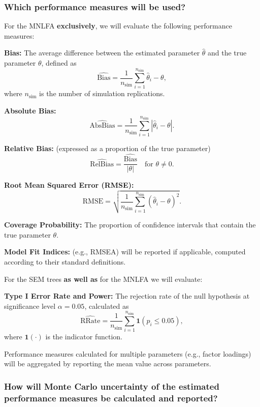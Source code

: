 \documentclass[
  man,
  floatsintext]{apa7}
\begin{document}
\subsubsection{Which performance measures will be
used?}\label{which-performance-measures-will-be-used}

For the MNLFA \textbf{exclusively}, we will evaluate the following
performance measures:

\textbf{Bias:} The average difference between the estimated parameter
\(\hat{\theta}\) and the true parameter \(\theta\), defined as \[
\widehat{\text{Bias}} = \frac{1}{n_{\text{sim}}} \sum_{i=1}^{n_{\text{sim}}} \hat{\theta}_i - \theta,
\] where \(n_{\text{sim}}\) is the number of simulation replications.

\textbf{Absolute Bias:} \[
\widehat{\text{AbsBias}} = \frac{1}{n_{\text{sim}}} \sum_{i=1}^{n_{\text{sim}}} \left| \hat{\theta}_i - \theta \right|.
\]

\textbf{Relative Bias:} (expressed as a proportion of the true
parameter) \[
\widehat{\text{RelBias}} = \frac{\widehat{\text{Bias}}}{|\theta|} \quad \text{for } \theta \neq 0.
\]

\textbf{Root Mean Squared Error (RMSE):} \[
\widehat{\text{RMSE}} = \sqrt{ \frac{1}{n_{\text{sim}}} \sum_{i=1}^{n_{\text{sim}}} (\hat{\theta}_i - \theta)^2}.
\]

\textbf{Coverage Probability:} The proportion of confidence intervals
that contain the true parameter \(\theta\).

\textbf{Model Fit Indices:} (e.g., RMSEA) will be reported if
applicable, computed according to their standard definitions.

For the SEM trees \textbf{as well as} for the MNLFA we will evaluate:

\textbf{Type I Error Rate and Power:} The rejection rate of the null
hypothesis at significance level \(\alpha = 0.05\), calculated as \[
\widehat{\text{RRate}} = \frac{1}{n_{\text{sim}}} \sum_{i=1}^{n_{\text{sim}}} \mathbf{1}(p_i \leq 0.05),
\] where \(\mathbf{1}(\cdot)\) is the indicator function.

Performance measures calculated for multiple parameters (e.g., factor
loadings) will be aggregated by reporting the mean value across
parameters.

\subsubsection{How will Monte Carlo uncertainty of the estimated
performance measures be calculated and
reported?}\label{how-will-monte-carlo-uncertainty-of-the-estimated-performance-measures-be-calculated-and-reported}
\end{document}
